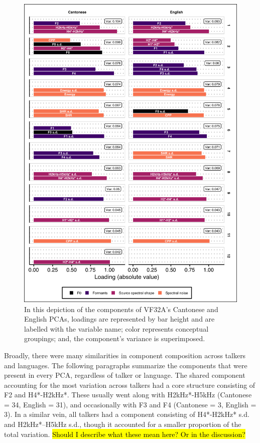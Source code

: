 \begin{figure}[htbp]
\begin{center}
\includegraphics[width=0.8\linewidth]{figures/ch3_pca_vf32a_vert5in.png} 
\caption{In this depiction of the components of VF32A's Cantonese and English PCAs, loadings are represented by bar height and are labelled with the variable name; color represents conceptual groupings; and, the component's variance is superimposed.}
\label{ch3:fig:VF32A}
\end{center}
\end{figure}

Broadly, there were many similarities in component composition across talkers and languages. The following paragraphs summarize the components that were present in every PCA, regardless of talker or language. The shared component accounting for the most variation across talkers had a core structure consisting of F2 and H4*-H2kHz*. These usually went along with H2kHz*-H5kHz (Cantonese = 34, English = 31), and occasionally with F3 and F4 (Cantonese = 3, English = 3). In a similar vein, all talkers had a component consisting of H4*-H2kHz* s.d. and H2kHz*--H5kHz s.d., though it accounted for a smaller proportion of the total variation. \hl{Should I describe what these mean here? Or in the discussion?}

